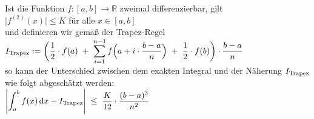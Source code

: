 \begin{Satz}
  Ist die Funktion $f:[a,b]\rightarrow \mathbb{R}$ zweimal differenzierbar, gilt
  \\[0.2cm]
  \hspace*{1.3cm}
  $\bigl|f^{(2)}(x)\bigr| \leq K$ \quad f\"ur alle $x\in[a,b]$
  \\[0.2cm]
  und definieren wir gem\"a{\ss} der Trapez-Regel 
  \\[0.2cm]
  \hspace*{1.3cm}
  $\displaystyle I_{\mbox{\scriptsize Trapez}} := \biggl(\frac{1}{2}\cdot f(a) \;+\; \sum\limits_{i=1}^{n-1} f\Bigl(a+i\cdot \frac{b-a}{n}\Bigr)\;+\;\frac{1}{2}\cdot f(b)\biggr) \cdot  \frac{b-a}{n}$
  \\[0.2cm]
  so kann der Unterschied zwischen dem exakten Integral und der N\"aherung $I_{\mbox{\scriptsize Trapez}}$
  wie folgt abgesch\"atzt werden:
  \\[0.2cm]
  \hspace*{1.3cm}
  $\displaystyle \left| \int_a^b f(x)\,\textrm{d} x - I_{\mbox{\scriptsize Trapez}} \right| \;\leq\; 
   \frac{K}{12}\cdot  \frac{(b-a)^3}{n^2}$
\end{Satz}

